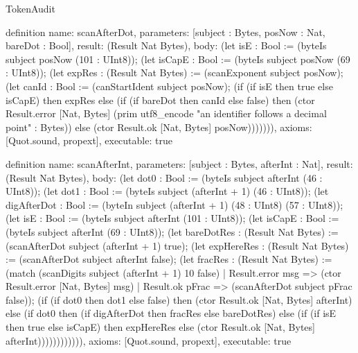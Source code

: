 \begin{lexlean}{TokenAudit}
\begin{semanticmodule}
definition{
  name: scanAfterDot,
  parameters: [subject : Bytes, posNow : Nat, bareDot : Bool],
  result: (Result Nat Bytes),
  body: (let isE : Bool := (byteIs subject posNow (101 : UInt8)); (let isCapE : Bool := (byteIs subject posNow (69 : UInt8)); (let expRes : (Result Nat Bytes) := (scanExponent subject posNow); (let canId : Bool := (canStartIdent subject posNow); (if (if isE then true else isCapE) then expRes else (if (if bareDot then canId else false) then (ctor Result.error [Nat, Bytes] (prim utf8_encode "an identifier follows a decimal point" : Bytes)) else (ctor Result.ok [Nat, Bytes] posNow))))))),
  axioms: [Quot.sound, propext],
  executable: true
}

definition{
  name: scanAfterInt,
  parameters: [subject : Bytes, afterInt : Nat],
  result: (Result Nat Bytes),
  body: (let dot0 : Bool := (byteIs subject afterInt (46 : UInt8)); (let dot1 : Bool := (byteIs subject (afterInt + 1) (46 : UInt8)); (let digAfterDot : Bool := (byteIn subject (afterInt + 1) (48 : UInt8) (57 : UInt8)); (let isE : Bool := (byteIs subject afterInt (101 : UInt8)); (let isCapE : Bool := (byteIs subject afterInt (69 : UInt8)); (let bareDotRes : (Result Nat Bytes) := (scanAfterDot subject (afterInt + 1) true); (let expHereRes : (Result Nat Bytes) := (scanAfterDot subject afterInt false); (let fracRes : (Result Nat Bytes) := (match (scanDigits subject (afterInt + 1) 10 false)
    | Result.error msg => (ctor Result.error [Nat, Bytes] msg)
    | Result.ok pFrac => (scanAfterDot subject pFrac false)); (if (if dot0 then dot1 else false) then (ctor Result.ok [Nat, Bytes] afterInt) else (if dot0 then (if digAfterDot then fracRes else bareDotRes) else (if (if isE then true else isCapE) then expHereRes else (ctor Result.ok [Nat, Bytes] afterInt)))))))))))),
  axioms: [Quot.sound, propext],
  executable: true
}


\end{semanticmodule}
\end{lexlean}
